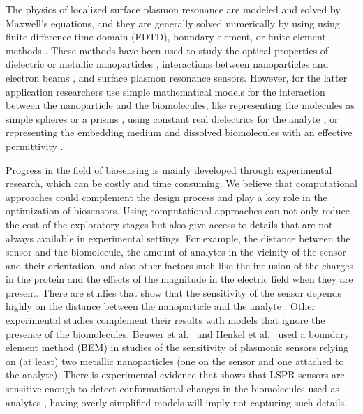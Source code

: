 The physics of localized surface plasmon resonance are modeled and solved by Maxwell's equations, and they are generally solved numerically 
by using using finite difference time-domain (FDTD), boundary element, or finite element methods \cite{SolisTaboadaObelleiroLiz-MaarzanGarciadeabajo2014}.
These methods have been used to study the optical properties of dielectric or metallic nanoparticles \cite{Hohenester2018,HohenesterTrugler2012,
JungPedersenSondergaardPedersenLarsenNielsen2010, VideenSun2003,MayergoyzFredkinZhang2005, MayergoyzZhang2007}, interactions between nanoparticles
and electron beams \cite{GarciadeabajoAizpurua1997, GarciadeabajoHowie2002}, and surface plasmon resonance sensors. However, for the latter application 
researchers use simple mathematical models for the interaction between the nanoparticle and the biomolecules, like representing the molecules as simple 
spheres \cite{DavisGomezVernon2010,AntosiewiczApellClaudioKall2011, SantiagoCordobaETal2011, ShenETal2013, UngerETal2009} or a prisms \cite{DanHu2014}, using 
constant real dielectrics for the analyte \cite{NghiemETal2012, SantiagoCordobaETal2011, ShenETal2013, UngerETal2009}, or representing the embedding medium 
and dissolved biomolecules with an effective permittivity \cite{JungCampbellChinowskyMarYee1998,WilletsVandyune2007,PhanETal2013}.

Progress in the field of biosensing is mainly developed through experimental research, which can be costly and time consuming. We believe that 
computational approaches could complement the design process and play a key role in the optimization of biosensors. Using computational approaches
can not only reduce the cost of the exploratory stages but also give access to details that are not always available in experimental settings. For example, 
the distance between the sensor and the biomolecule, the amount of analytes in the vicinity of the sensor and their orientation, and also other factors such like
the inclusion of the charges in the protein and the effects of the magnitude in the electric field when they are present. There are studies that show that 
the sensitivity of the sensor depends highly on the distance between the nanoparticle and the analyte \cite{HaesETal2004}. Other experimental studies complement
their results with models that ignore the presence of the biomolecules. Beuwer et al.~\cite{BeuwervanHoofZijlstra2018} and Henkel et al.~\cite{HenkelETal2018} 
used a boundary element method (BEM) in studies of the sensitivity of plasmonic sensors relying on (at least) two metallic nanoparticles 
(one on the sensor and one attached to the analyte). There is experimental evidence that shows that LSPR sensors are sensitive enough to detect conformational
changes in the biomolecules used as analytes \cite{HallETal2011}, having overly simplified models will imply not capturing such details. 

